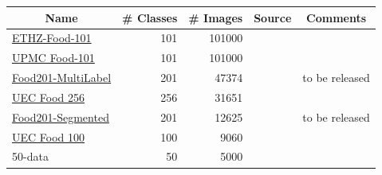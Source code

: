 \begin{table}[htbp]
	\centering
	\begin{tabular}{@{}lrrll@{}}
		\toprule
		\multicolumn{1}{c}{\textbf{Name}} & \multicolumn{1}{c}{\textbf{\# Classes}} & \multicolumn{1}{c}{\textbf{\# Images}} & \multicolumn{1}{c}{\textbf{Source}} & \multicolumn{1}{c}{\textbf{Comments}} \\ \midrule
		\hyperref[subsec:relWork_Datasets_food101]{ETHZ-Food-101}                    & 101                                     & 101000                                 & \cite{Bossard2014}                              &                                       \\
		\hyperref[subsec:relWork_Datasets_food101]{UPMC Food-101}                     & 101                                     & 101000                                 & \cite{Kumar2015}                              &                                       \\
		
		\hyperref[subsec:relWork_Datasets_food201]{Food201-MultiLabel}                & 201                                     & 47374                                  & \cite{Meyers2015}                              & to be released                        \\
	
		\hyperref[subsec:relWork_Datasets_food100256]{UEC Food 256}                      & 256                                     & 31651                                  & \cite{Kawano2015}                              &                                       \\
	
		\hyperref[subsec:relWork_Datasets_food201]{Food201-Segmented}                 & 201                                     & 12625                                  & \cite{Meyers2015}                              & to be released                        \\
		
		\hyperref[subsec:relWork_Datasets_food100256]{UEC Food 100}                      & 100                                     & 9060                                   & \cite{Matsuda2012}                              &                                       \\
		
		50-data							  & 50                                      & 5000                                   & \cite{Chen2012}                              &                                       \\
		

\end{tabular}
\end{table}
